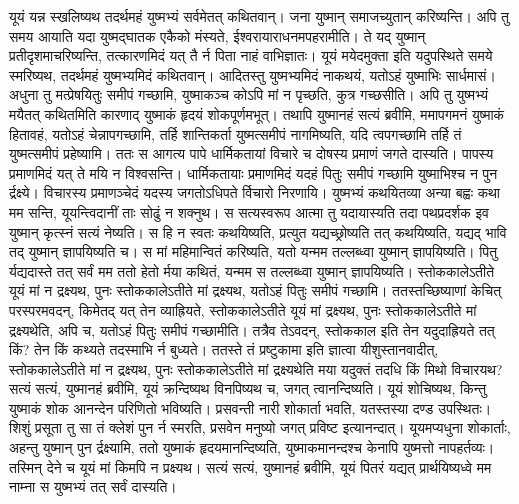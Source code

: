 \adhyAya
{}
\vakya यूयं यन्न स्खलिष्यथ तदर्थमहं युष्मभ्यं सर्वमेतत् कथितवान्।
\vakya जना युष्मान् समाजच्युतान् करिष्यन्ति। अपि तु समय आयाति यदा युष्मद्घातक एकैको मंस्यते, ईश्वरायाराधनमपहरामीति।
\vakya ते यद् युष्मान् प्रतीदृशमाचरिष्यन्ति, तत्कारणमिदं यत् तै र्न पिता नाहं वाभिज्ञातः।
\vakya यूयं मयेदमुक्ता इति यदुपस्थिते समये स्मरिष्यथ, तदर्थमहं युष्मभ्यमिदं कथितवान्। आदितस्तु युष्मभ्यमिदं नाकथयं, यतोऽहं युष्माभिः सार्धमासं।
\vakya अधुना तु मत्प्रेषयितुः समीपं गच्छामि, युष्माकञ्च कोऽपि मां न पृच्छति, कुत्र गच्छसीति।
\vakya अपि तु युष्मभ्यं मयैतत् कथितमिति कारणाद् युष्माकं हृदयं शोकपूर्णमभूत्।
\vakya तथापि युष्मानहं सत्यं ब्रवीमि, ममापगमनं युष्माकं हितावहं, यतोऽहं चेन्नापगच्छामि, तर्हि शान्तिकर्ता युष्मत्समीपं नागमिष्यति, यदि त्वपगच्छामि तर्हि तं युष्मत्समीपं प्रहेष्यामि।
\vakya ततः स आगत्य पापे धार्मिकतायां विचारे च दोषस्य प्रमाणं जगते दास्यति।
\vakya पापस्य प्रमाणमिदं यत् ते मयि न विश्वसन्ति।
\vakya धार्मिकतायाः प्रमाणमिदं यदहं पितुः समीपं गच्छामि युष्माभिश्च न पुन र्द्रक्ष्ये।
\vakya विचारस्य प्रमाणञ्चेदं यदस्य जगतोऽधिपते र्विचारो निरणायि।
\vakya युष्मभ्यं कथयितव्या अन्या बह्वः कथा मम सन्ति, यूयन्त्विदानीं ताः सोढुं न शक्नुथ।
\vakya स सत्यस्वरूप आत्मा तु यदायास्यति तदा पथप्रदर्शक इव युष्मान् कृत्स्नं सत्यं नेष्यति। स हि न स्वतः कथयिष्यति, प्रत्युत यद्यच्छ्रोष्यति तत् कथयिष्यति, यद्यद् भावि तद् युष्मान् ज्ञापयिष्यति च।
\vakya स मां महिमान्वितं करिष्यति, यतो यन्मम तल्लब्ध्वा युष्मान् ज्ञापयिष्यति।
\vakya पितु र्यद्यदास्ते तत् सर्वं मम ततो हेतो र्मया कथितं, यन्मम स तल्लब्ध्वा युष्मान् ज्ञापयिष्यति।
\vakya स्तोककालेऽतीते यूयं मां न द्रक्ष्यथ, पुनः स्तोककालेऽतीते मां द्रक्ष्यथ, यतोऽहं पितुः समीपं गच्छामि।
\vakya ततस्तच्छिष्याणां केचित् परस्परमवदन्, किमेतद् यत् तेन व्याह्रियते, स्तोककालेऽतीते यूयं मां द्रक्ष्यथ, पुनः स्तोककालेऽतीते मां द्रक्ष्यथेति, अपि च, यतोऽहं पितुः समीपं गच्छामीति।
\vakya तत्रैव तेऽवदन्, स्तोककाल इति तेन यदुदाह्रियते तत् किं? तेन किं कथ्यते तदस्माभि र्न बुध्यते।
\vakya ततस्ते तं प्रष्टुकामा इति ज्ञात्वा यीशुस्तानवादीत्, स्तोककालेऽतीते मां न द्रक्ष्यथ, पुनः स्तोककालेऽतीते मां द्रक्ष्यथेति मया यदुक्तं तदधि किं मिथो विचारयथ?
\vakya सत्यं सत्यं, युष्मानहं ब्रवीमि, यूयं क्रन्दिष्यथ विनपिष्यथ च, जगत् त्वानन्दिष्यति। यूयं शोचिष्यथ, किन्तु युष्माकं शोक आनन्देन परिणितो भविष्यति।
\vakya प्रसवन्ती नारी शोकार्ता भवति, यतस्तस्या दण्ड उपस्थितः। शिशुं प्रसूता तु सा तं क्लेशं पुन र्न स्मरति, प्रसवेन मनुष्यो जगत् प्रविष्ट इत्यानन्दात्।
\vakya यूयमप्यधुना शोकार्ताः, अहन्तु युष्मान् पुन र्द्रक्ष्यामि, ततो युष्माकं हृदयमानन्दिष्यति, युष्माकमानन्दश्च केनापि युष्मत्तो नापहर्तव्यः।
\vakya तस्मिन् देने च यूयं मां किमपि न प्रक्ष्यथ। सत्यं सत्यं, युष्मानहं ब्रवीमि, यूयं पितरं यद्यत् प्रार्थयिष्यध्वे मम नाम्ना स युष्मभ्यं तत् सर्वं दास्यति।
